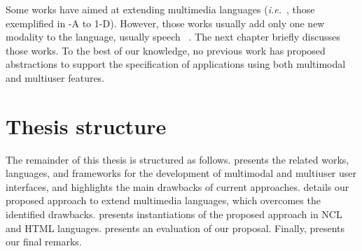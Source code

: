 Some works have aimed at extending multimedia languages (\textit{i.e.}~, those exemplified
in -A to 1-D). However, those works usually add only one new
modality to the language, usually speech
~\cite{beckham_towards_2001,carvalho_architectures_2008,
carvalho_estendendo_2010,	w3c_xhtml+voice_2001,wang_salt:_2002}. The next
chapter briefly discusses those works. To the best of our knowledge, no previous
work has proposed abstractions to support the specification of applications
using both multimodal and multiuser features.

\section{Thesis structure}
\label{sec:intro:structure}

The remainder of this thesis is structured as follows.  presents
the related works, languages, and frameworks for the development of multimodal
and multiuser user interfaces, and highlights the main drawbacks of current
approaches.  details our proposed approach to extend
multimedia languages, which overcomes the identified drawbacks.
 presents instantiations of the proposed approach in NCL
and HTML languages.  presents an evaluation of our proposal.
Finally,  presents our final remarks.
